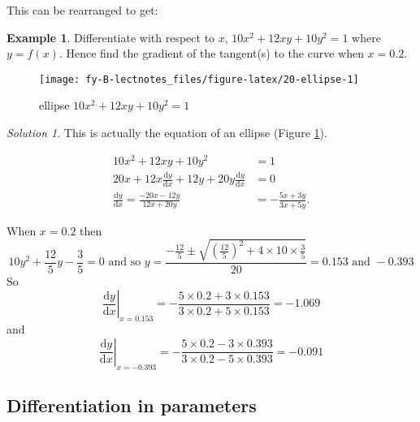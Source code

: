 \documentclass[
  11pt,
  oneside]{book}
\newcommand{\slide}{}
\theoremstyle{definition}
\theoremstyle{definition}
\newtheorem{example}{Example}[chapter]
\theoremstyle{definition}
\theoremstyle{definition}
\theoremstyle{remark}
\newtheorem*{solution}{Solution}
\begin{document}
\begin{slidesonly}

\slide

This can be rearranged to get:

\end{slidesonly}

\slide

\begin{example}
Differentiate with respect to \(x\), \(10x^2 + 12xy + 10y^2 = 1\) where \(y = f(x)\). Hence find the gradient of the tangent(s) to the curve when \(x=0.2\).
\end{example}

\begin{figure}

{\centering \texttt{[image: fy-B-lectnotes\_files/figure-latex/20-ellipse-1]} 

}

\caption{ellipse $10x^2 + 12xy + 10y^2 = 1$}\label{fig:20-ellipse}
\end{figure}

\begin{solution}
This is actually the equation of an ellipse (Figure \ref{fig:20-ellipse}).

\begin{align*}
10x^2 + 12xy + 10y^2 &= 1\\
20x+12x\frac{\mathrm{d} y}{\mathrm{d} x}+12y+20y\frac{\mathrm{d} y}{\mathrm{d} x} &=0\\
\frac{\mathrm{d} y}{\mathrm{d} x} = \frac{-20x-12y}{12x+20y} &= -\frac{5x+3y}{3x+5y}.
\end{align*}

When \(x=0.2\) then
\[
10y^2+\frac{12}5y-\frac35=0\text{ and so }y = \frac{-\frac{12}5\pm\sqrt{\left(\frac{12}5\right)^2+4\times10\times\frac35}}{20} = 0.153\text{ and }-0.393
\]
So
\[
\left.\frac{\mathrm{d} y}{\mathrm{d} x}\right|_{x=0.153} = -\frac{5\times0.2+3\times 0.153}{3\times0.2+5\times0.153} = -1.069
\]
and
\[
\left.\frac{\mathrm{d} y}{\mathrm{d} x}\right|_{x=-0.393} = -\frac{5\times0.2-3\times 0.393}{3\times0.2-5\times0.393} = -0.091
\]
\end{solution}

\slide

\begin{slidesonly}

\phantom{a}
\slide

\end{slidesonly}

\subsection{Differentiation in parameters}\label{differentiation-in-parameters}
\end{document}
